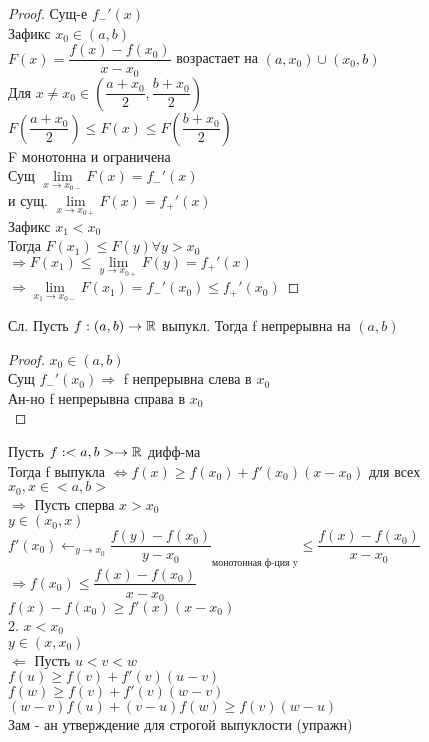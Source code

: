 \begin{proof}
	Сущ-е $ f_-' (x) $ \\
	Зафикс $ x_0 \in (a, b) $ \\
	$ F(x) = \dfrac{f(x) - f(x_0)}{x - x_0} $ возрастает на $ (a, x_0) \cup (x_0, b) $ \\
	Для $ x \neq x_0 \in \left( \dfrac{a + x_0}{2}, \dfrac{b+ x_0}{2} \right) $ \\
	$ F(\dfrac{a + x_0}{2}) \leq F(x) \leq F(\dfrac{b + x_0}{2}) $ \\
	F монотонна и ограничена \\
	Сущ $ \lim\limits_{x \rightarrow x_{0-}} F(x) =  f_-' (x)$ \\
	и сущ. $ \lim\limits_{x \rightarrow x_{0+}} F(x) =  f_+' (x)$ \\
	Зафикс $ x_1 < x_0 $ \\
	Тогда $ F(x_1) \leq F(y) \forall y > x_0 $ \\
	$ \Rightarrow F(x_1) \leq \lim\limits_{y \rightarrow x_{0+}} F(y) =  f_+' (x) $ \\
	$ \Rightarrow \lim\limits_{x_1 \rightarrow x_{0-}} F(x_1) =  f_-' (x_0) \leq   f_+' (x_0) $
\end{proof}
Сл. Пусть $ f : (a, b) \rightarrow \mathbb{R} $ выпукл. Тогда f непрерывна на $ (a,b) $ \\
\begin{proof}
	$ x_0 \in (a, b) $ \\
	Сущ $ f_-' (x_0) \Rightarrow $ f непрерывна слева в $x_0$ \\
	Ан-но f непрерывна справа в $x_0$  \\
\end{proof}
\begin{theorem}
	Пусть $ f : <a,b> \rightarrow \mathbb{R} $ дифф-ма \\
	Тогда f выпукла $ \Leftrightarrow f(x) \geq f(x_0) + f'(x_0)(x - x_0) $ для всех $ x_0, x \in <a,b> $ \\
	$ \Rightarrow $ Пусть сперва $ x > x_0 $ \\
	$ y \in (x_0, x) $ \\
	$ f'(x_0) \leftarrow_{y \rightarrow x_0} \dfrac{f(y) - f(x_0)}{y - x_0}_{\text{монотонная ф-ция y}} \leq \dfrac{f(x) - f(x_0)}{x - x_0} $ \\
	$ \Rightarrow f(x_0) \leq \dfrac{f(x) - f(x_0)}{x - x_0} $ \\
	$ f(x) - f(x_0) \geq f'(x) (x - x_0) $ \\
	2. $ x < x_0 $ \\
	$ y \in (x, x_0) $ \\
	$ \Leftarrow $ Пусть $ u < v < w $ \\
	$ f(u) \geq f(v) + f'(v) (u - v) $ \\
	$ f(w) \geq f(v) + f'(v) (w - v) $ \\
	$ (w - v) f(u) + (v - u) f(w) \geq f(v) (w - u) $ \\
	Зам - ан утверждение для строгой выпуклости (упражн)
\end{theorem}

